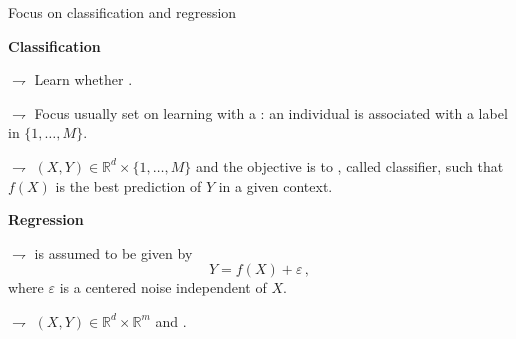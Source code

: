 \documentclass[xcolor={usenames,dvipsnames},handout]{beamer}
\begin{document}
\begin{frame}{Focus on classification and regression}

{\bf Classification}


$\rightharpoondown$  Learn whether . 

$\rightharpoondown$  Focus usually set on learning with a :  an individual is associated with a label in $\{1,\ldots,M\}$. 

$\rightharpoondown$  $(X,Y)\in\mathbb{R}^d\times \{1,\ldots,M\}$ and the objective is to , called classifier, such that $f(X)$ is the best prediction of $Y$ in a given context.

\vspace{.5cm}

{\bf Regression}



$\rightharpoondown$  is assumed to be given by
$$
Y = f(X) + \varepsilon\,,
$$
where $\varepsilon$ is a centered noise independent of $X$. 

$\rightharpoondown$ $(X,Y)\in\mathbb{R}^d\times \mathbb{R}^m$ and . %
\end{frame}
\end{document}
